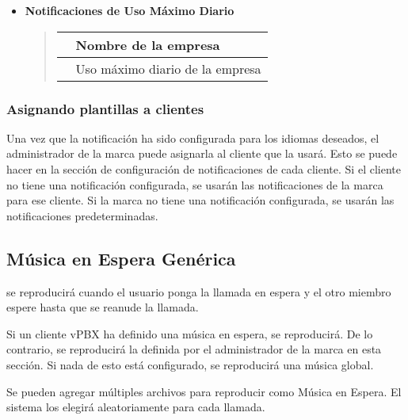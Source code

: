 \documentclass[letterpaper,10pt,spanish]{sphinxmanual}
\begin{document}
\begin{itemize}
\item {} 
\textbf{Notificaciones de Uso Máximo Diario}
\begin{quote}

\noindent\begin{tabulary}{\linewidth}{|L|L|}
\hline

&
Nombre de la empresa
\\
\hline
{}
&
Uso máximo diario de la empresa
\\
\hline\end{tabulary}

\end{quote}

\end{itemize}


\subsubsection{Asignando plantillas a clientes}
\label{administration_portal/brand/settings/notification_templates:assigning-templates-to-clients}
Una vez que la notificación ha sido configurada para los idiomas deseados, el administrador de la marca puede asignarla al cliente que la usará. Esto se puede hacer en la sección de configuración de notificaciones de cada cliente. Si el cliente no tiene una notificación configurada, se usarán las notificaciones de la marca para ese cliente. Si la marca no tiene una notificación configurada, se usarán las notificaciones predeterminadas.


\subsection{Música en Espera Genérica}
\label{administration_portal/brand/settings/generic_music_on_hold:generic-music-on-hold}\label{administration_portal/brand/settings/generic_music_on_hold::doc}
{\hyperref[administration_portal/client/vpbx/multimedia/music_on_hold:music\string-on\string-hold]{}} se reproducirá cuando el usuario ponga la llamada en espera y el otro miembro espere hasta que se reanude la llamada.

Si un cliente vPBX ha definido una música en espera, se reproducirá. De lo contrario, se reproducirá la definida por el administrador de la marca en esta sección. Si nada de esto está configurado, se reproducirá una música global.

Se pueden agregar múltiples archivos para reproducir como Música en Espera. El sistema los elegirá aleatoriamente para cada llamada.
\end{document}
